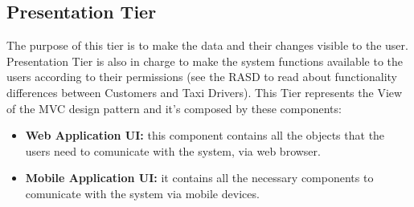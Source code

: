 \documentclass[../../../../../../dd.tex]{subfiles}
\begin{document}
	\subsection{Presentation Tier}
		The purpose of this tier is to make the data and their changes visible to the user. Presentation Tier is also in charge to make the system functions available to the users according to their permissions (see the RASD to read about functionality differences between Customers and Taxi Drivers).
		This Tier represents the View of the MVC design pattern and it's composed by these components:
		\begin{itemize}
			\item \textbf{Web Application UI:}  this component contains all the objects that the users need to comunicate with the system, via web browser.
			\item \textbf{Mobile Application UI:} it contains all the necessary components to comunicate with the system via mobile devices. 
		\end{itemize}
	
\end{document}
